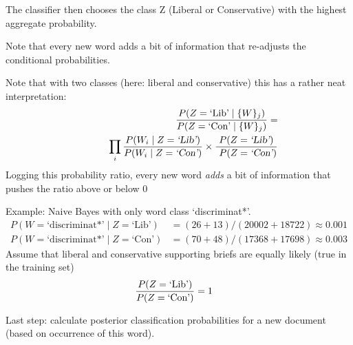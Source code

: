 \documentclass{mediumfoils}
\begin{document}
The classifier then chooses the class Z (Liberal or Conservative) with the highest aggregate probability.

Note that every new word adds a bit of information that re-adjusts the conditional probabilities.

\newpage





Note that with two classes (here: liberal and conservative)  this has a rather neat interpretation:
\begin{align*}
\frac{P(Z=\text{\text{`Lib'}} \mid \{W\}_j)}
{P(Z=\text{`Con'} \mid \{W\}_j)} = \\
~~~~~~~~~\prod_i \frac{P(W_i \mid Z=\textsl{\text{`Lib'}})}
{P(W_i \mid Z=\textsl{`Con'})}\times \frac{P(Z=\textsl{\text{`Lib'}})}{~P(Z=\textsl{`Con'})}
\end{align*}
Logging this probability ratio, every new word \textsl{adds} a bit of information that pushes the ratio above or below 0






Example: Naive Bayes with only word class `discriminat*'.
{\small
\begin{align*}
P(W=\text{`discriminat*'} \mid Z=\text{`Lib'}) & = (26+13)/(20002+18722) \approx 0.001\\
P(W=\text{`discriminat*'} \mid Z=\text{`Con'}) & = (70+48)/(17368+17698) \approx 0.003
\end{align*}
}
Assume that liberal and conservative supporting briefs are equally likely (true in the training set)
\begin{align*}
\frac{P(Z=\text{\text{`Lib'}})}{P(Z=\text{`Con'})} & = 1
\end{align*}

Last step:  calculate posterior classification  probabilities for a new document (based on occurrence of this word).
\end{document}
